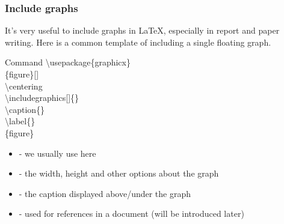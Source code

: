 \documentclass{beamer}
\newenvironment{command}{\begin{block}{Command}}{\end{block}}
\newcommand{\samplebegin}[1]{\structure{\textbackslash begin}\{#1\}}
\newcommand{\sampleend}[1]{\structure{\textbackslash end}\{#1\}}
\newcommand{\samplecommand}[1]{\alert{\textbackslash #1}}
\begin{document}
\begin{frame}
	\frametitle{Include graphs}
	It's very useful to include graphs in \LaTeX, especially in report and paper writing. Here is a common template of including a single floating graph.
	\begin{command}
		\samplecommand{usepackage}\{graphicx\}\\
		\samplebegin{figure}[]\\
		\qquad\samplecommand{centering}\\
		\qquad\samplecommand{includegraphics}[]\{\}\\
		\qquad\samplecommand{caption}\{\}\\
		\qquad\samplecommand{label}\{\}\\
		\sampleend{figure}
		\begin{itemize}
			\item {} - we usually use  here
			\item {} - the width, height and other options about the graph
			\item {} - the caption displayed above/under the graph
			\item {} - used for references in a document (will be introduced later)
		\end{itemize}
	\end{command}
\end{frame}
\end{document}
